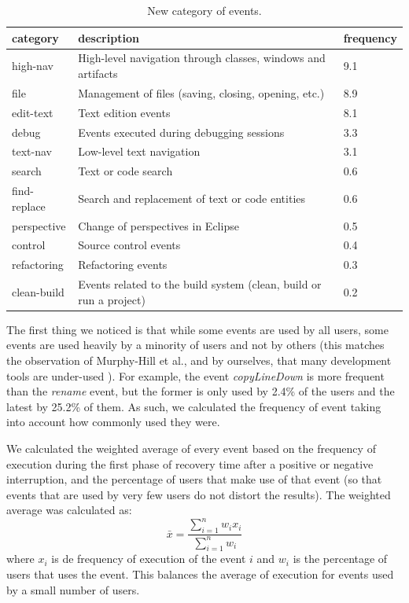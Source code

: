 \documentclass[times]{smrauth}
\begin{document}
\begin{table}[ht!]
	\small
	\renewcommand{\arraystretch}{1.3}
	\caption{New category of events. }
	\label{tbl:new_events_udc}
	\centering
	\begin{tabular}{|p{2.5cm}|p{8 cm}| p{2cm} |}
		\hline 
		category & description & frequency \\  
		\hline 
		\hline 
		high-nav & High-level navigation through classes, windows and artifacts & 9.1 \\
		file & Management of files (saving, closing, opening, etc.) &	8.9 \\
		edit-text & Text edition events & 8.1 \\
		debug & Events executed during debugging sessions & 3.3 \\
		text-nav & Low-level text navigation & 3.1 \\
		search & Text or code search & 0.6 \\
		find-replace & Search and replacement of text or code entities & 0.6 \\
		perspective & Change of perspectives in Eclipse & 0.5  \\
		control & Source control events & 0.4 \\
		refactoring & Refactoring events & 0.3\\
		clean-build &  Events related to the build system (clean, build or run a project) & 0.2\\
		\hline
	\end{tabular}
\end{table}

The first thing we noticed is that while some events are used by all users, some events are used heavily by a minority of users and not by others (this matches the observation of Murphy-Hill et al., and by ourselves, that many development tools are under-used \cite{MPB12}). For example, the event \textit{copyLineDown} is more frequent than the \textit{rename} event, but the former is only used by 2.4\% of the users and the latest by 25.2\% of them. As such, we calculated the frequency of event taking into account how commonly used they were.

We calculated the weighted average of every event based on the frequency of execution during the first phase of recovery time after a positive or negative interruption, and the percentage of users that make use of that event (so that events that are used by very few users do not distort the results). The weighted average was calculated as: $$\bar{x} = \frac{\sum_{i=1}^{n}w_ix_i}{\sum_{i=1}^{n}w_i} $$where $x_i$ is de frequency of execution of the event $i$ and $w_i$ is the percentage of users that uses the event. This balances the average of execution for events used by a small number of users. 
\end{document}
